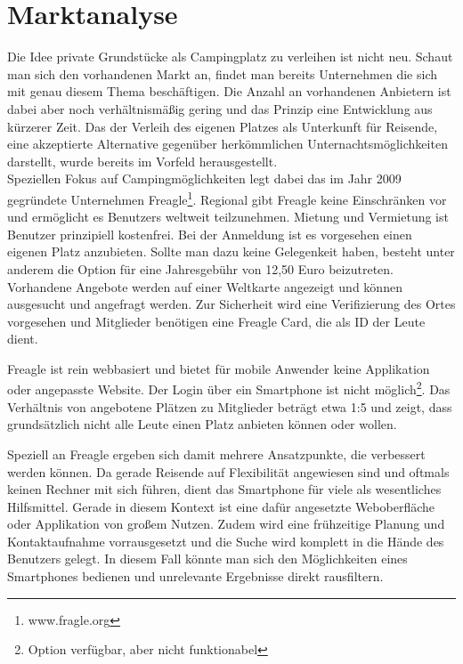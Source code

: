 
\section{Marktanalyse}
    Die Idee private Grundstücke als Campingplatz zu verleihen ist nicht neu. Schaut man sich den vorhandenen Markt an, findet man bereits Unternehmen die sich mit genau diesem Thema beschäftigen. Die Anzahl an vorhandenen Anbietern ist dabei aber noch verhältnismäßig gering und das Prinzip eine Entwicklung aus kürzerer Zeit. Das der Verleih des eigenen Platzes als Unterkunft für Reisende, eine akzeptierte Alternative gegenüber herkömmlichen Unternachtsmöglichkeiten darstellt, wurde bereits im Vorfeld herausgestellt.\\
    Speziellen Fokus auf Campingmöglichkeiten legt dabei das im Jahr 2009 gegründete Unternehmen Freagle\footnote{www.fragle.org}. Regional gibt Freagle keine Einschränken vor und ermöglicht es Benutzers weltweit teilzunehmen. Mietung und Vermietung ist Benutzer prinzipiell kostenfrei. Bei der Anmeldung ist es vorgesehen einen eigenen Platz anzubieten. Sollte man dazu keine Gelegenkeit haben, besteht unter anderem die Option für eine Jahresgebühr von 12,50 Euro beizutreten. Vorhandene Angebote werden auf einer Weltkarte angezeigt und können ausgesucht und angefragt werden. Zur Sicherheit wird eine Verifizierung des Ortes vorgesehen und Mitglieder benötigen eine Freagle Card, die als ID der Leute dient.

    Freagle ist rein webbasiert und bietet für mobile Anwender keine  Applikation oder angepasste Website. Der Login über ein Smartphone ist nicht möglich\footnote{Option verfügbar, aber nicht funktionabel}.
    Das Verhältnis von angebotene Plätzen zu Mitglieder beträgt etwa 1:5 und zeigt, dass grundsätzlich nicht alle Leute einen Platz anbieten können oder wollen.

    Speziell an Freagle ergeben sich damit mehrere Ansatzpunkte, die verbessert werden können. Da gerade Reisende auf Flexibilität angewiesen sind und oftmals keinen Rechner mit sich führen, dient das Smartphone für viele als wesentliches Hilfsmittel. Gerade in diesem Kontext ist eine dafür angesetzte Weboberfläche oder Applikation von großem Nutzen. Zudem wird eine frühzeitige Planung und Kontaktaufnahme vorrausgesetzt und die Suche wird komplett in die Hände des Benutzers gelegt. In diesem Fall könnte man sich den Möglichkeiten eines Smartphones bedienen und unrelevante Ergebnisse direkt rausfiltern. 


